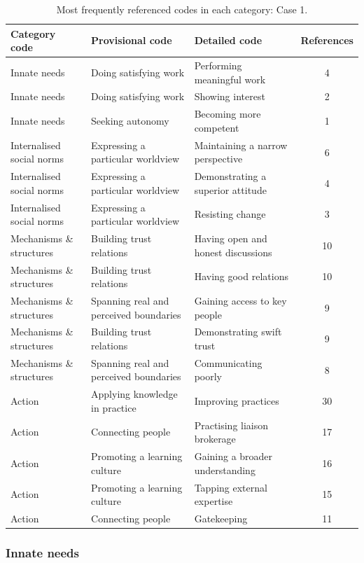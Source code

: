 \begin{table}
\centering
\caption{Most frequently referenced codes in each category: Case 1.}
\label{tab:case_1_codes}
\begin{tabular}{lllc}
\toprule
Category code & Provisional code & Detailed code & References \\ 
\midrule
Innate needs & Doing satisfying work & Performing meaningful work &   4 \\ 
Innate needs & Doing satisfying work & Showing interest &   2 \\ 
Innate needs & Seeking autonomy & Becoming more competent &   1 \\ 
Internalised social norms & Expressing a particular worldview & Maintaining a narrow perspective &   6 \\ 
Internalised social norms & Expressing a particular worldview & Demonstrating a superior attitude &   4 \\ 
Internalised social norms & Expressing a particular worldview & Resisting change &   3 \\ 
Mechanisms \& structures & Building trust relations & Having open and honest discussions &  10 \\ 
Mechanisms \& structures & Building trust relations & Having good relations &  10 \\ 
Mechanisms \& structures & Spanning real and perceived boundaries & Gaining access to key people &   9 \\ 
Mechanisms \& structures & Building trust relations & Demonstrating swift trust &   9 \\ 
Mechanisms \& structures & Spanning real and perceived boundaries & Communicating poorly &   8 \\ 
Action & Applying knowledge in practice & Improving practices &  30 \\ 
Action & Connecting people & Practising liaison brokerage &  17 \\ 
Action & Promoting a learning culture & Gaining a broader understanding &  16 \\ 
Action & Promoting a learning culture & Tapping external expertise &  15 \\ 
Action & Connecting people & Gatekeeping &  11 \\ 
\bottomrule
\end{tabular}
\end{table}

\subsubsection{Innate needs}

